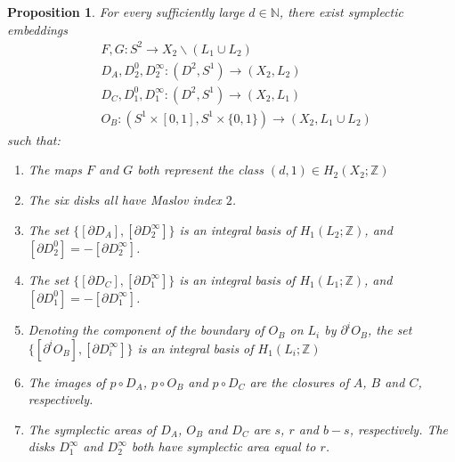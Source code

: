 \documentclass[10pt,a4paper]{amsart}
\newtheorem{proposition}{Proposition}
\newcommand{\NN}{{\mathbb N}}
\newcommand{\ZZ}{{\mathbb Z}}
\begin{document}
\begin{proposition}\label{prop:submanifolds}
For every sufficiently large $d \in \NN$, there exist symplectic embeddings
\begin{align*}
    &F,G \colon S^2 \to X_2 \smallsetminus (L_1 \cup L_2) \\
    &D_A, D^0_2, D^\infty_2 \colon  (D^2,S^1) \to (X_2,L_2) \\
    &D_C, D^0_1, D^\infty_1 \colon  (D^2,S^1) \to (X_2,L_1) \\
    &O_B \colon (S^1 \times [0,1],S^1 \times \{0,1\}) \to (X_2,L_1 \cup L_2)
\end{align*}
such that:\\

\begin{enumerate}

\item  The maps $F$ and $G$ both represent the class $(d,1) \in H_2(X_2; \ZZ)$\\

\item The six disks all have Maslov index $2$.\\



\item The set $\{[\partial D_A], [\partial D^\infty_2]\}$ is an integral basis of $H_1(L_2;\ZZ)$, and $[\partial  D^0_2]=-[\partial  D^\infty_2]$.\\

\item The set $\{[\partial D_C], [ \partial D^\infty_1]\}$ is an integral basis of $H_1(L_1;\ZZ)$, and $[\partial  D^0_1]=-[\partial D^\infty_1]$.\\

\item Denoting the component of the boundary of $O_B$ on $L_i$ by $\partial^i O_B$, the set $\{[\partial^i O_B], [\partial D^\infty_i]\}$ is an integral basis of $H_1(L_i;\ZZ)$\\



\item The images of  $p \circ D_A$, $p \circ O_B$ and  $p \circ D_C$ are the closures of $A$, $B$ and $C$, respectively.\\

\item The symplectic areas of  $D_A$, $O_B$ and  $D_C$ are $s$, $r$ and $b-s$, respectively. The disks $D^\infty_1$ and $D^\infty_2$ both have symplectic area equal to $r$.\\


\end{enumerate}
\end{proposition}
\end{document}
